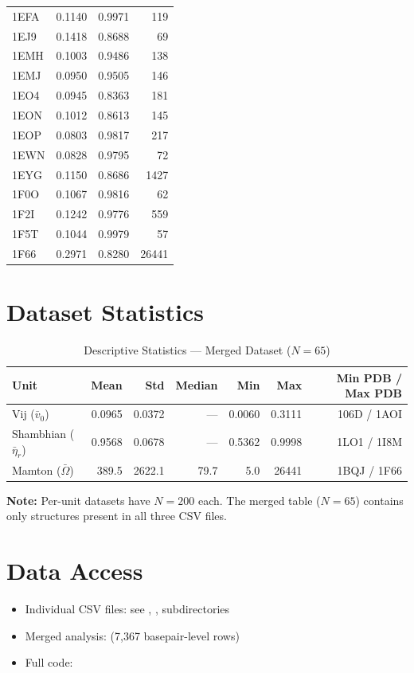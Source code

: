\begin{longtable}{lrrr}
        1EFA & 0.1140 & 0.9971 & 119 \\
        1EJ9 & 0.1418 & 0.8688 & 69 \\
        1EMH & 0.1003 & 0.9486 & 138 \\
        1EMJ & 0.0950 & 0.9505 & 146 \\
        1EO4 & 0.0945 & 0.8363 & 181 \\
        1EON & 0.1012 & 0.8613 & 145 \\
        1EOP & 0.0803 & 0.9817 & 217 \\
        1EWN & 0.0828 & 0.9795 & 72 \\
        1EYG & 0.1150 & 0.8686 & 1427 \\
        1F0O & 0.1067 & 0.9816 & 62 \\
        1F2I & 0.1242 & 0.9776 & 559 \\
        1F5T & 0.1044 & 0.9979 & 57 \\
        1F66 & 0.2971 & 0.8280 & 26441 \\
\end{longtable}

\section{Dataset Statistics}

\begin{table}[h]
    \centering
    \caption{Descriptive Statistics --- Merged Dataset ($N = 65$)}
    \begin{tabular}{lrrrrrr}
        \toprule
        \textbf{Unit} & \textbf{Mean} & \textbf{Std} & \textbf{Median} & \textbf{Min} & \textbf{Max} & \textbf{Min PDB / Max PDB} \\
        \midrule
        Vij ($\bar{v}_0$) & 0.0965 & 0.0372 & --- & 0.0060 & 0.3111 & 106D / 1AOI \\
        Shambhian ($\bar{\eta}_r$) & 0.9568 & 0.0678 & --- & 0.5362 & 0.9998 & 1LO1 / 1I8M \\
        Mamton ($\bar{\Omega}$) & 389.5 & 2622.1 & 79.7 & 5.0 & 26441 & 1BQJ / 1F66 \\
        \bottomrule
    \end{tabular}
\end{table}

\textbf{Note:} Per-unit datasets have $N = 200$ each. The merged table ($N = 65$) contains only structures present in all three CSV files.

\section{Data Access}

\begin{itemize}
    \item Individual CSV files: see , ,  subdirectories
    \item Merged analysis:  (7,367 basepair-level rows)
    \item Full code: 
\end{itemize}

